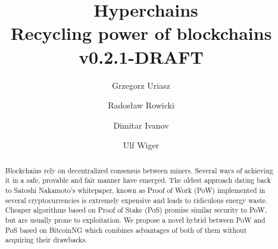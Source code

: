 \documentclass{article}
\title{\huge \Aet\ Hyperchains \\[0.5em]
  \large Recycling power of blockchains
  \\[1em] v0.2.1-DRAFT }
\author{ Grzegorz Uriasz
  \and Radosław Rowicki
  \and Dimitar Ivanov
  \and Ulf Wiger
}
\begin{document}
\maketitle

\begin{abstract}
  Blockchains rely on decentralized consensus between miners. Several ways of
  achieving it in a safe, provable and fair manner have emerged. The oldest
  approach dating back to Satoshi Nakamoto's whitepaper, known as Proof of Work
  (PoW) implemented in several cryptocurrencies is extremely expensive and
  leads to ridiculous energy waste. Cheaper algorithms based on Proof of Stake (PoS)
  promise similar security to PoW, but are usually prone to exploitation. We
  propose a novel hybrid between PoW and PoS based on BitcoinNG which combines
  advantages of both of them without acquiring their drawbacks.
\end{abstract}

\tableofcontents

\newpage









 
\end{document}
